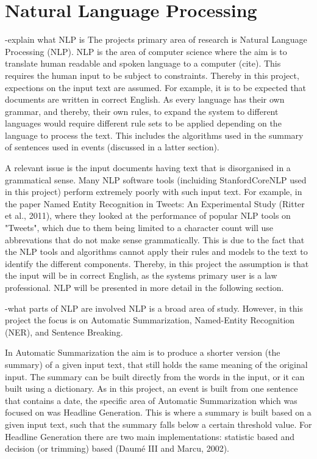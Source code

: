 \section{Natural Language Processing}
-explain what NLP is
The projects primary area of research is Natural Language Processing (NLP). NLP is the area of computer science where the aim is to translate human readable and spoken language to a computer (cite). This requires the human input to be subject to constraints. Thereby in this project, expections on the input text are assumed. For example, it is to be expected that documents are written in correct English. As every language has their own grammar, and thereby, their own rules, to expand the system to different languages would require different rule sets to be applied depending on the language to process the text. This includes the algorithms used in the summary of sentences used in events (discussed in a latter section).\par
A relevant issue is the input documents having text that is disorganised in a grammatical sense. Many NLP software tools (incluiding StanfordCoreNLP used in this project) perform extremely poorly with such input text. For example, in the paper Named Entity Recognition in Tweets: An Experimental Study (Ritter et al., 2011), where they looked at the performance of popular NLP tools on "Tweets", which due to them being limited to a character count will use abbrevations that do not make sense grammatically. This is due to the fact that the NLP tools and algorithms cannot apply their rules and models to the text to identify the different components. Thereby, in this project the assumption is that the input will be in correct English, as the systems primary user is a law professional. NLP will be presented in more detail in the following section.\par
-what parts of NLP are involved
NLP is a broad area of study. However, in this project the focus is on Automatic Summarization, Named-Entity Recognition (NER), and Sentence Breaking.\par
In Automatic Summarization the aim is to produce a shorter version (the summary) of a given input text, that still holds the same meaning of the original input. The summary can be built directly from the words in the input, or it can built using a dictionary. As in this project, an event is built from one sentence that contains a date, the specific area of Automatic Summarization which was focused on was Headline Generation. This is where a summary is built based on a given input text, such that the summary falls below a certain threshold value. For Headline Generation there are two main implementations: statistic based and decision (or trimming) based (Daum\'e III and Marcu, 2002).\par
